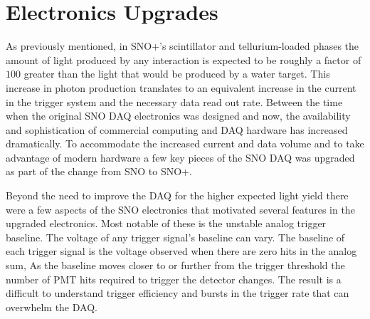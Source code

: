 

\section{Electronics Upgrades}
\label{sec:upgrades}
As previously mentioned, in SNO+'s scintillator and tellurium-loaded phases the
amount of light produced by any interaction is expected to be roughly a factor
of $100$ greater than the light that would be produced by a water target.
This increase in photon production translates to an equivalent increase in the
current in the trigger system and the necessary data read out rate.
Between the time when the original SNO DAQ electronics was designed and now,
the availability and sophistication of commercial computing and DAQ hardware
has increased dramatically.
To accommodate the increased current and data volume and to take advantage of modern
hardware a few key pieces of the SNO DAQ was upgraded as part of the change from
SNO to SNO+.

Beyond the need to improve the DAQ for the higher expected light
yield there were a few aspects of the SNO electronics that motivated several
features in the upgraded electronics.
Most notable of these is the unstable analog trigger baseline.
The voltage of any trigger signal's baseline can vary.
The baseline of each trigger signal is the voltage observed
when there are zero hits in the analog sum,
As the baseline moves closer to or further from the trigger threshold
the number of PMT hits required to trigger the detector changes.
The result is a difficult to understand trigger efficiency and bursts in the trigger
rate that can overwhelm the DAQ\@.


